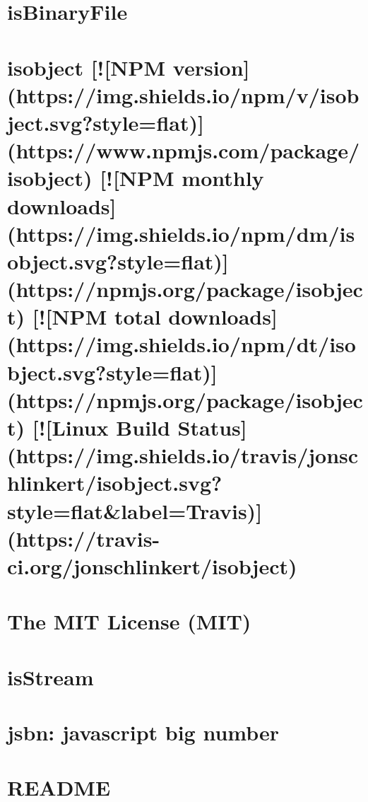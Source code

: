\documentclass[twoside]{book}
\newcommand{\+}{\discretionary{\mbox{\scriptsize$\hookleftarrow$}}{}{}}
\begin{document}
\chapter{is\+Binary\+File}
\label{md_dsmacc_vis_degree_node_modules_isbinaryfile_README}

\chapter{isobject \mbox{[}!\mbox{[}N\+PM version\mbox{]}(https\+://img.shields.\+io/npm/v/isobject.svg?style=flat)\mbox{]}(https\+://www.npmjs.\+com/package/isobject) \mbox{[}!\mbox{[}N\+PM monthly downloads\mbox{]}(https\+://img.shields.\+io/npm/dm/isobject.svg?style=flat)\mbox{]}(https\+://npmjs.org/package/isobject) \mbox{[}!\mbox{[}N\+PM total downloads\mbox{]}(https\+://img.shields.\+io/npm/dt/isobject.svg?style=flat)\mbox{]}(https\+://npmjs.org/package/isobject) \mbox{[}!\mbox{[}Linux Build Status\mbox{]}(https\+://img.shields.\+io/travis/jonschlinkert/isobject.svg?style=flat\&label=Travis)\mbox{]}(https\+://travis-\/ci.org/jonschlinkert/isobject)}
\label{md_dsmacc_vis_degree_node_modules_isobject_README}

\chapter{The M\+IT License (M\+IT)}
\label{md_dsmacc_vis_degree_node_modules_isstream_LICENSE}

\chapter{is\+Stream}
\label{md_dsmacc_vis_degree_node_modules_isstream_README}

\chapter{jsbn\+: javascript big number}
\label{md_dsmacc_vis_degree_node_modules_jsbn_README}

\chapter{R\+E\+A\+D\+ME}
\label{md_dsmacc_vis_degree_node_modules_json-schema_README}

\end{document}

